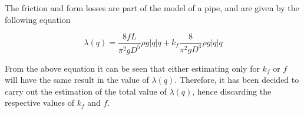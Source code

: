 The friction and form losses are part of the model of a pipe, and are given by the following equation

\begin{equation}
  \lambda (q) =  \frac{8fL}{\pi^{2}gD^5} \rho g  |q| q + k_f \frac{8}{\pi^2gD^4} \rho g |q| q
  \label{frictionestimation}
\end{equation}

From the above equation it can be seen that either estimating only for $k_f$ or $f$ will have the same result in the value of $\lambda (q)$.
Therefore, it has been decided to carry out the estimation of the total value of $\lambda (q)$, hence discarding the respective values of $k_f$ and $f$.

